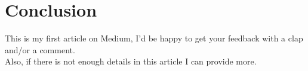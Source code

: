 \section{Conclusion}

This is my first article on Medium, I'd be happy to get your feedback with a clap and/or a comment. \\

Also, if there is not enough details in this article I can provide more.